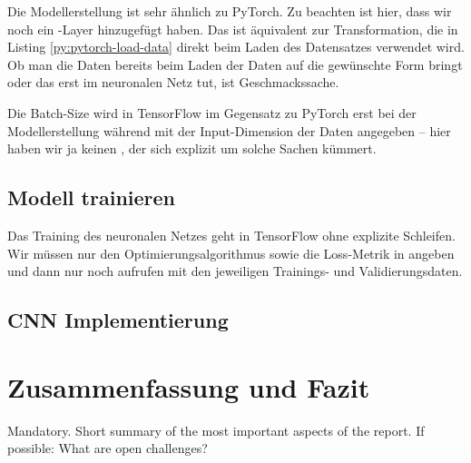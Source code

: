 Die Modellerstellung ist sehr ähnlich zu PyTorch. Zu beachten ist hier, dass 
wir noch ein -Layer hinzugefügt haben. Das ist äquivalent zur 
 Transformation, die in Listing \ref{py:pytorch-load-data} direkt beim 
Laden des Datensatzes verwendet wird. 
Ob man die Daten bereits beim Laden der Daten auf die gewünschte Form bringt oder das 
erst im neuronalen Netz tut, ist Geschmackssache. 

Die Batch-Size wird in TensorFlow im Gegensatz zu PyTorch erst bei der Modellerstellung 
während  mit der Input-Dimension der Daten angegeben -- hier haben wir ja 
keinen , der sich explizit um solche Sachen kümmert.

\subsection{Modell trainieren}



Das Training des neuronalen Netzes geht in TensorFlow ohne explizite Schleifen. 
Wir müssen nur den Optimierungsalgorithmus sowie die Loss-Metrik in  
angeben und dann nur noch  aufrufen mit den jeweiligen Trainings- und 
Validierungsdaten. 


\subsection{CNN Implementierung}







\section{Zusammenfassung und Fazit}
Mandatory. Short summary of the most important aspects of the report.
If possible: What are open challenges?






